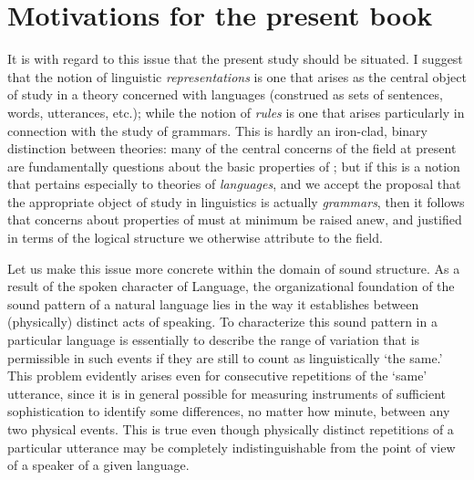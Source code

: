 \section*{Motivations for the present book}

It is with regard to this issue that the present study should be
situated.  I suggest that the notion of linguistic
\textit{representations} is one that arises as the central object of
study in a theory concerned with languages (construed as sets of
sentences, words, utterances, etc.); while the notion of
\textit{rules} is one that arises particularly in connection with the
study of grammars.  This is hardly an iron-clad, binary distinction
between theories: many of the central concerns of the field at present
are fundamentally questions about the basic properties of
; but if this is a notion that pertains especially to
theories of \emph{languages}, and we accept the proposal that the
appropriate object of study in linguistics is actually
\emph{grammars}, then it follows that concerns about properties of
 must at minimum be raised anew, and justified in terms
of the logical structure we otherwise attribute to the field.

Let us make this issue more concrete within the domain of sound
structure. As a result of the spoken character of Language, the
organizational foundation of the sound pattern of a natural language
lies in the way it establishes  between
(physically) distinct acts of speaking.  To characterize this sound
pattern in a particular language is essentially to describe the range
of {variation} that is permissible in such events if they are still to
count as linguistically `the same.' This problem evidently arises even
for consecutive repetitions of the `same' utterance, since it is in
general possible for measuring instruments of sufficient
sophistication to identify some differences, no matter how minute,
between any two physical events.  This is true even though physically
distinct repetitions of a particular utterance may be completely
indistinguishable from the point of view of a speaker of a given
language.


